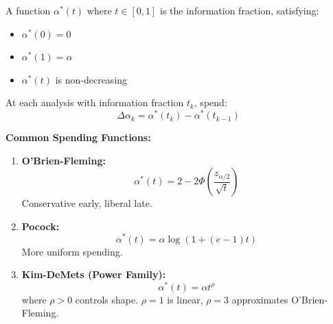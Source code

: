 \begin{definition}
A function $\alpha^*(t)$ where $t \in [0,1]$ is the information fraction, satisfying:
\begin{itemize}
    \item $\alpha^*(0) = 0$
    \item $\alpha^*(1) = \alpha$
    \item $\alpha^*(t)$ is non-decreasing
\end{itemize}

At each analysis with information fraction $t_k$, spend:
\begin{equation}
\Delta\alpha_k = \alpha^*(t_k) - \alpha^*(t_{k-1})
\end{equation}
\end{definition}

\textbf{Common Spending Functions:}

\begin{enumerate}
    \item \textbf{O'Brien-Fleming:}
    \begin{equation}
    \alpha^*(t) = 2 - 2\Phi\left(\frac{z_{\alpha/2}}{\sqrt{t}}\right)
    \end{equation}
    Conservative early, liberal late.

    \item \textbf{Pocock:}
    \begin{equation}
    \alpha^*(t) = \alpha \log(1 + (e - 1)t)
    \end{equation}
    More uniform spending.

    \item \textbf{Kim-DeMets (Power Family):}
    \begin{equation}
    \alpha^*(t) = \alpha t^\rho
    \end{equation}
    where $\rho > 0$ controls shape. $\rho = 1$ is linear, $\rho = 3$ approximates O'Brien-Fleming.
\end{enumerate}

